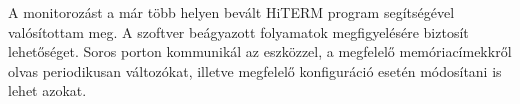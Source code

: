 A monitorozást a már több helyen bevált HiTERM program segítségével valósítottam meg. A szoftver beágyazott folyamatok megfigyelésére biztosít lehetőséget. Soros porton kommunikál az eszközzel, a megfelelő memóriacímekkről olvas periodikusan változókat, illetve megfelelő konfiguráció esetén módosítani is lehet azokat.